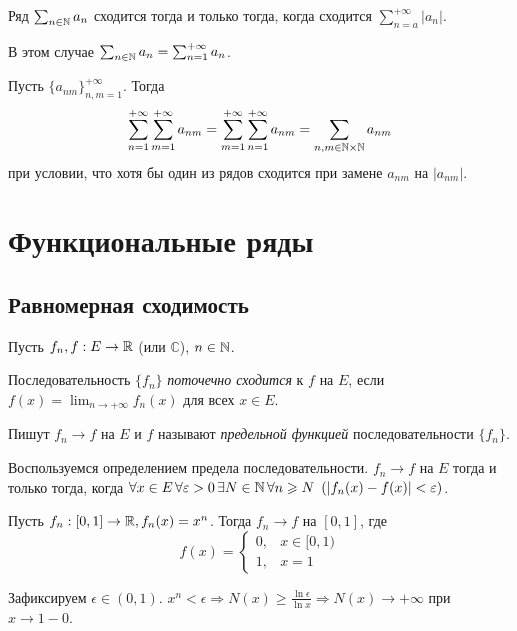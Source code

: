 \begin{corollary}
    Ряд $\sum_{n \in \mathbb{N}} a_n$ сходится тогда и только тогда, когда сходится $\sum_{n = a}^{+\infty} |a_n|$.

    В этом случае $\sum_{n \in \mathbb{N}} a_n = \sum_{n = 1}^{+\infty} a_n$.
\end{corollary}

\begin{corollary}
    Пусть $\{a_{nm}\}_{n, m = 1}^{+\infty}$. Тогда
    \[
        \sum_{n = 1}^{+\infty} \sum_{m = 1}^{+\infty} a_{nm} = \sum_{m = 1}^{+\infty} \sum_{n = 1}^{+\infty} a_{nm} = \sum_{n, m \in \mathbb{N} \times \mathbb{N}} a_{nm}
    \]
    при условии, что хотя бы один из рядов сходится при замене $a_{nm}$ на $|a_{nm}|$.
\end{corollary}

\section{Функциональные ряды}

\subsection{Равномерная сходимость}

Пусть $f_n, f : E \rightarrow \mathbb{R}$ (или $\mathbb{C}$), $n \in \mathbb{N}$.
\begin{definition}
    Последовательность $\{f_n\}$ \emph{поточечно сходится} к $f$ на $E$, если $f(x) = \lim_{n \rightarrow {+\infty}} f_n(x)$ для всех $x \in E$.

    Пишут $f_n \rightarrow f$ на $E$ и $f$ называют \emph{предельной функцией} последовательности $\{f_n\}$.
\end{definition}

Воспользуемся определением предела последовательности. $f_n \rightarrow f$ на $E$ тогда и только тогда, когда $\forall x \in E \, \forall \epsilon > 0 \, \exists N \in \N \, \forall n \ge N \ \left(|f_n(x) - f(x)| < \epsilon\right)$.

\begin{example}
    Пусть $f_n: [0, 1] \rightarrow \mathbb{R}, f_n(x) = x^n$. Тогда $f_n \rightarrow f$ на $[0, 1]$, где
    \[
        f(x) = \left\{\begin{array}{lc}
                0, & x \in [0, 1) \\
                1, & x = 1
        \end{array}\right.
    \]

    Зафиксируем $\epsilon \in (0, 1)$. $x^n < \epsilon \Rightarrow N(x) \ge \frac{\ln \epsilon}{\ln x} \Rightarrow N(x) \rightarrow +\infty$ при $x \rightarrow 1 - 0$.
\end{example}

